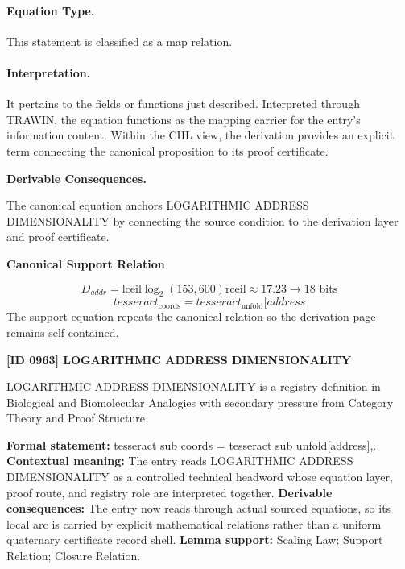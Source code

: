 \paragraph{Equation Type.}
This statement is classified as a map relation.

\paragraph{Interpretation.}
It pertains to the fields or functions just described. Interpreted through TRAWIN, the equation functions as the mapping carrier for the entry’s information content. Within the CHL view, the derivation provides an explicit term connecting the canonical proposition to its proof certificate.

\par\vspace{0.35em}
\noindent\textbf{Derivable Consequences.}\quad
\begingroup
\footnotesize
\raggedright
The canonical equation anchors LOGARITHMIC ADDRESS DIMENSIONALITY by connecting the source condition to the derivation layer and proof certificate.
\par\endgroup

\noindent\textbf{Canonical Support Relation}\par
\[
D_{addr} = \mathrm{lceil} \log_2(153,600) \mathrm{rceil} \approx 17.23 \to 18 \text{ bits}
\]
\[
tesseract_{\mathrm{coords}} = tesseract_{\mathrm{unfold}}[address
\]
\noindent The support equation repeats the canonical relation so the derivation page remains self-contained.\par

\clearpage
\noindent\textbf{[ID 0963] LOGARITHMIC ADDRESS DIMENSIONALITY}\par
\vspace{0.35em}
\begingroup\small
{}
LOGARITHMIC ADDRESS DIMENSIONALITY is a registry definition in Biological and Biomolecular Analogies with secondary pressure from Category Theory and Proof Structure.

\begingroup\footnotesize\setlength{\emergencystretch}{3em}\sloppy
\textbf{Formal statement:} tesseract sub coords = tesseract sub unfold[address],. \textbf{Contextual meaning:} The entry reads LOGARITHMIC ADDRESS DIMENSIONALITY as a controlled technical headword whose equation layer, proof route, and registry role are interpreted together. \textbf{Derivable consequences:} The entry now reads through actual sourced equations, so its local arc is carried by explicit mathematical relations rather than a uniform quaternary certificate record shell. \textbf{Lemma support:} Scaling Law; Support Relation; Closure Relation.\par
\endgroup

